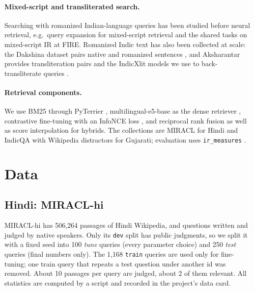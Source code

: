 \documentclass[11pt,a4paper]{article}
\begin{document}
\paragraph{Mixed-script and transliterated search.}
Searching with romanized Indian-language queries has been studied before neural retrieval,
e.g.\ query expansion for mixed-script retrieval \citep{gupta2014query} and the shared tasks
on mixed-script IR at FIRE. Romanized Indic text has also been collected at scale: the
Dakshina dataset pairs native and romanized sentences \citep{roark2020dakshina}, and
Aksharantar provides transliteration pairs and the IndicXlit models we use to
back-transliterate queries \citep{madhani2023aksharantar}.

\paragraph{Retrieval components.}
We use BM25 \citep{robertson2009bm25} through PyTerrier \citep{macdonald2020pyterrier},
multilingual-e5-base as the dense retriever \citep{wang2024me5}, contrastive fine-tuning with
an InfoNCE loss \citep{oord2018infonce,karpukhin2020dpr}, and reciprocal rank fusion
\citep{cormack2009rrf} as well as score interpolation for hybrids. The collections are
MIRACL \citep{zhang2022miracl} for Hindi and IndicQA \citep{doddapaneni2023indicxtreme} with
Wikipedia distractors for Gujarati; evaluation uses \texttt{ir\_measures}
\citep{macavaney2022irmeasures}.

\section{Data}

\subsection{Hindi: MIRACL-hi}
MIRACL-hi \citep{zhang2022miracl} has 506,264 passages of Hindi Wikipedia, and questions
written and judged by native speakers. Only its \texttt{dev} split has public judgments, so we
split it with a fixed seed into 100 \emph{tune} queries (every parameter choice) and 250
\emph{test} queries (final numbers only). The 1,168 \texttt{train} queries are used only for
fine-tuning; one train query that repeats a test question under another id was removed. About
10 passages per query are judged, about 2 of them relevant. All statistics are computed by a
script and recorded in the project's data card.
\end{document}
